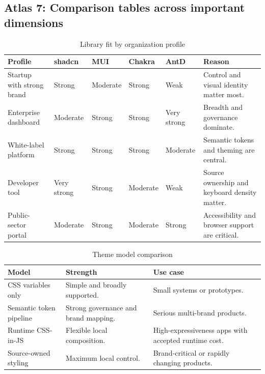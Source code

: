 \subsection*{Atlas 7: Comparison tables across important dimensions}
\begin{table}[htbp]
  \centering
  \caption{Library fit by organization profile}
  \begin{tabularx}{\textwidth}{@{}p{}p{}p{}p{}p{}Y@{}}
    \toprule
    \textbf{Profile} & \textbf{shadcn} & \textbf{MUI} & \textbf{Chakra} & \textbf{AntD} & \textbf{Reason} \\
    \midrule
    Startup with strong brand & Strong & Moderate & Strong & Weak & Control and visual identity matter most. \\
    Enterprise dashboard & Moderate & Strong & Strong & Very strong & Breadth and governance dominate. \\
    White-label platform & Strong & Strong & Strong & Moderate & Semantic tokens and theming are central. \\
    Developer tool & Very strong & Strong & Moderate & Weak & Source ownership and keyboard density matter. \\
    Public-sector portal & Moderate & Strong & Moderate & Strong & Accessibility and browser support are critical. \\
    \bottomrule
  \end{tabularx}
\end{table}

\begin{table}[htbp]
  \centering
  \caption{Theme model comparison}
  \begin{tabularx}{\textwidth}{@{}p{}p{}Y@{}}
    \toprule
    \textbf{Model} & \textbf{Strength} & \textbf{Use case} \\
    \midrule
    CSS variables only & Simple and broadly supported. & Small systems or prototypes. \\
    Semantic token pipeline & Strong governance and brand mapping. & Serious multi-brand products. \\
    Runtime CSS-in-JS & Flexible local composition. & High-expressiveness apps with accepted runtime cost. \\
    Source-owned styling & Maximum local control. & Brand-critical or rapidly changing products. \\
    \bottomrule
  \end{tabularx}
\end{table}

